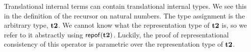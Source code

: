 \documentclass[10pt,preprint]{sigplanconf}
\begin{document}
{%
%
%

Translational internal terms can contain translational internal types. We see this in the definition of the recursor on natural numbers. The type assignment is the arbitrary type, ${\textbf{t2}}$. We cannot know what the representation type of ${\textbf{t2}}$ is, so we refer to it abstractly using ${\sf repof}({\textbf{t2}})$. Luckily, the proof of representational consistency of this operator is parametric over the representation type of ${\textbf{t2}}$. 

}
\end{document}
